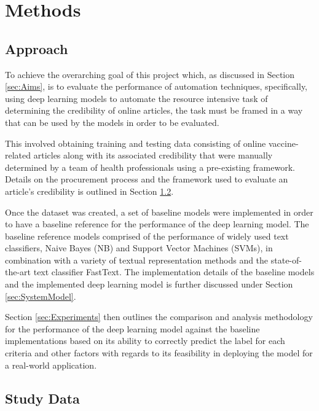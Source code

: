 \documentclass[a4paper,twoside,phd]{BYUPhys}
\begin{document}
\chapter{Methods}
\label{chap:Methods}

\section{Approach}
\label{sec:Approach}

To achieve the overarching goal of this project which, as discussed in Section \ref{sec:Aims}, is to evaluate the performance of automation techniques, specifically, using deep learning models to automate the resource intensive task of determining the credibility of online articles, the task must be framed in a way that can be used by the models in order to be evaluated. \newline

This involved obtaining training and testing data consisting of online vaccine-related articles along with its associated credibility that were manually determined by a team of health professionals using a pre-existing framework. Details on the procurement process and the framework used to evaluate an article's credibility is outlined in Section \ref{sec:StudyData}. \newline

Once the dataset was created, a set of baseline models were implemented in order to have a baseline reference for the performance of the deep learning model. The baseline reference models comprised of the performance of widely used text classifiers, Naive Bayes (NB) and Support Vector Machines (SVMs), in combination with a variety of textual representation methods and the state-of-the-art text classifier FastText. The implementation details of the baseline models and the implemented deep learning model is further discussed under Section \ref{sec:SystemModel}. \newline

Section \ref{sec:Experiments} then outlines the comparison and analysis methodology for the performance of the deep learning model against the baseline implementations based on its ability to correctly predict the label for each criteria and other factors with regards to its feasibility in deploying the model for a real-world application.

\section{Study Data}
\label{sec:StudyData}
\end{document}
